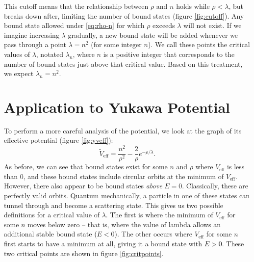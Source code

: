 \documentclass[12pt,twoside]{reedthesis}
\newcommand{\eqn}[1]{\begin{equation}#1\end{equation}}
\begin{document}
This cutoff means that the relationship between $\rho$ and $n$ holds while $\rho < \lambda$, but breaks down after, limiting the number of bound states (figure \ref{fig:cutoff}). Any bound state allowed under \eqref{eq:rho-n} for which $\rho$ exceeds $\lambda$ will not exist. If we imagine increasing $\lambda$ gradually, a new bound state will be added whenever we pass through a point $\lambda = n^2$ (for some integer $n$). We call these points the critical values of $\lambda$, notated $\lambda_{n}$, where $n$ is a positive integer that corresponds to the number of bound states just above that critical value. Based on this treatment, we expect $\lambda_{n} = n^2$.

\section{Application to Yukawa Potential}
To perform a more careful analysis of the potential, we look at the graph of its effective potential (figure \ref{fig:yveff}):
\eqn{
\tilde{V}_{\mathrm{eff}} = \frac{n^2}{\rho^2} - \frac{2}{\rho}e^{-\rho/\lambda}\mbox{.}
\label{eq:yveff}
}
As before, we can see that bound states exist for some $n$ and $\rho$ where $V_{\mathrm{eff}}$ is less than 0, and these bound states include circular orbits at the minimum of $V_{\mathrm{eff}}$. However, there also appear to be bound states \emph{above} $E = 0$. Classically, these are perfectly valid orbits. Quantum mechanically, a particle in one of these states can tunnel through and become a scattering state. This gives us two possible definitions for a critical value of $\lambda$.  The first is where the minimum of $V_{\mathrm{eff}}$ for some $n$ moves below zero -- that is, where the value of lambda allows an additional stable bound state ($E < 0$). The other occurs where $V_{\mathrm{eff}}$ for some $n$ first starts to have a minimum at all, giving it a bound state with $E>0$. These two critical points are shown in figure \ref{fig:critpoints}.
\end{document}
